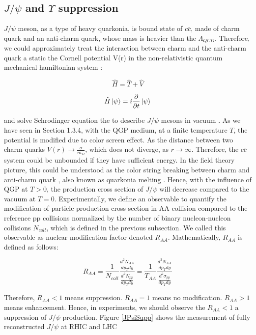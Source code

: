 \subsection{$J/\psi$ and $\Upsilon$ suppression} 

$J/\psi$ meson, as a type of heavy quarkonia, is bound state of $c\bar c$, made of charm quark and an anti-charm quark, whose mass is heavier than the $\Lambda_{QCD}$. Therefore, we could approximately treat the interaction between charm and the anti-charm quark a static the Cornell potential V(r) in the non-relativistic quantum mechanical hamiltonian system \cite{QuarkoniaV}: 

\begin{equation}
\hat H = \hat T + \hat V
\end{equation}

\begin{equation}
\hat H \ket{\psi} = i \frac{\partial}{\partial t}  \ket{\psi} 
\end{equation}

and solve Schrodinger equation the to describe $J/\psi$ mesons in vacuum \cite{}. As we have seen in Section 1.3.4, with the QGP medium, at a finite temperature $T$, the potential is modified due to color screen effect. As the distance between two charm quarks $V(r) \rightarrow \frac{\sigma}{m_D}$, which does not diverge, as $r \rightarrow \infty$. Therefore, the $c \bar c$ system could be unbounded if they have sufficient energy. In the field theory picture, this could be understood as the color string breaking between charm and anti-charm quark \cite{CSBQQ}, also known as quarkonia melting \cite{QQMelt}. Hence, with the influence of QGP at $T > 0$, the production cross section of $J/\psi$ will decrease compared to the vacuum at $T=0$. Experimentally, we define an observable to quantify the modification of particle production cross section in AA collision compared to the reference pp collisions normalized by the number of binary nucleon-nucleon collisions $N_{coll}$, which is defined in the previous subsection. We called this observable as nuclear modification factor denoted $R_{AA}$. Mathematically, $R_{AA}$ is defined as follows:

\begin{equation}
R_{AA} =\frac{1}{N_{coll}} \frac{\frac{d^2N_{AA}}{dp_T dy}}{\frac{d^2N_{pp}}{dp_T dy}} = \frac{1}{T_{AA}} \frac{\frac{d^2N_{AA}}{dp_T dy}}{\frac{d^2\sigma_{pp}}{dp_T dy}}
\end{equation}

Therefore, $R_{AA} < 1$ means suppression. $R_{AA} =1$ means no modification. $R_{AA} > 1$ means enhancement. Hence, in experiments, we should observe the $R_{AA} < 1$ a suppression of $J/\psi$ production. Figure \ref{JPsiSupp} shows the measurement of fully reconstructed $J/\psi$ at RHIC and LHC \cite{STARJpsi}


